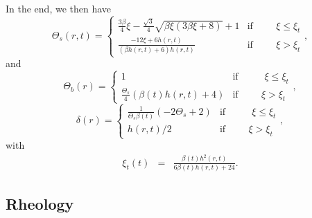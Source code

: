 In the end, we then have
\begin{equation}
  \Theta_s(r,t)=
  \begin{cases}
    \frac{3 \beta}{4} \xi - \frac{\sqrt{3}}{4} \sqrt{\beta \xi \left(3 \beta \xi + 8\right)} + 1 & \text{if} \hspace{1cm} \xi\leq \xi_t \\
    \frac{- 12  \xi +  6 h{\left  (r,t \right  )}}{\left(\beta h{\left
            (r,t  \right  )} +  6\right)  h{\left  (r,t \right  )}}  &
    \text{if} \hspace{1cm} \xi > \xi_t
  \end{cases},
  \label{C4-TS}
\end{equation}
and
\begin{equation}
  \Theta_b(r)=
  \begin{cases}
    1 &\text{if } \hspace{1cm} \xi\leq \xi_t \\
    \frac{\Theta_{s}}{4}  \left(\beta(t)  h{\left  (r,t  \right  )}  +
      4\right) & \text{if} \hspace{1cm} \xi > \xi_t
  \end{cases},
  \label{C4-TB}
\end{equation}
\begin{equation}
  \delta(r)=
  \begin{cases}
    \frac{1}{\Theta_{s} \beta(t)} \left(- 2 \Theta_{s} + 2\right) &\text{if } \hspace{1cm} \xi\leq \xi_t \\
    h(r,t)/2 & \text{if} \hspace{1cm} \xi > \xi_t
  \end{cases},
  \label{C4-DELTA}
\end{equation}
with
\begin{eqnarray}
  \xi_t(t)&=&\frac{\beta(t) h^{2}{\left (r,t \right )}}{6 \beta(t) h{\left (r,t \right )}
              + 24}.
\end{eqnarray}

\subsection{Rheology}
\label{C4-sec:rheology}

